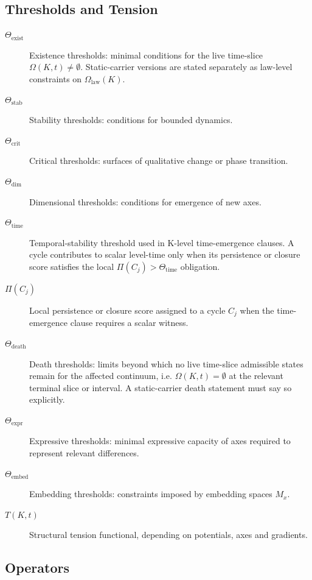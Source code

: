 \subsection{Thresholds and Tension}

\begin{description}
  \item[\(\Theta_{\mathrm{exist}}\)] Existence thresholds:
        minimal conditions for the live time-slice
        \(\Omega(K,t)\neq\emptyset\). Static-carrier versions are stated
        separately as law-level constraints on \(\Omega_{\mathrm{law}}(K)\).
  \item[\(\Theta_{\mathrm{stab}}\)] Stability thresholds:
        conditions for bounded dynamics.
  \item[\(\Theta_{\mathrm{crit}}\)] Critical thresholds:
        surfaces of qualitative change or phase transition.
  \item[\(\Theta_{\mathrm{dim}}\)] Dimensional thresholds:
        conditions for emergence of new axes.
  \item[\(\Theta_{\mathrm{time}}\)] Temporal-stability threshold used in
        K-level time-emergence clauses. A cycle contributes to scalar level-time
        only when its persistence or closure score satisfies the local
        \(\Pi(C_j)>\Theta_{\mathrm{time}}\) obligation.
  \item[\(\Pi(C_j)\)] Local persistence or closure score assigned to a cycle
        \(C_j\) when the time-emergence clause requires a scalar witness.
  \item[\(\Theta_{\mathrm{death}}\)] Death thresholds:
        limits beyond which no live time-slice admissible states remain for
        the affected continuum, i.e. \(\Omega(K,t)=\emptyset\) at the relevant
        terminal slice or interval. A static-carrier death statement must say
        so explicitly.
  \item[\(\Theta_{\mathrm{expr}}\)] Expressive thresholds:
        minimal expressive capacity of axes required to represent relevant
        differences.
  \item[\(\Theta_{\mathrm{embed}}\)] Embedding thresholds:
        constraints imposed by embedding spaces \(M_x\).
  \item[\(T(K,t)\)] Structural tension functional, depending on potentials,
        axes and gradients.
\end{description}

\subsection{Operators}

